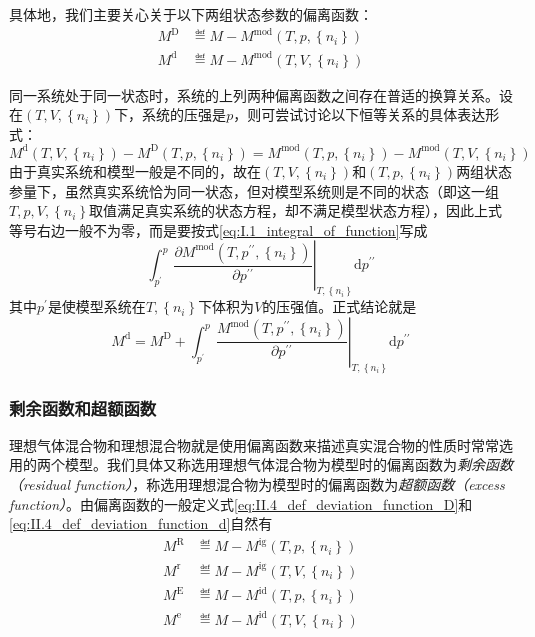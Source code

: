 \documentclass[main.tex]{subfiles}
\begin{document}
具体地，我们主要关心关于以下两组状态参数的偏离函数：
\begin{align}
  M^\text{D} & \eqdef M-M^\text{mod}\left(T,p,\left\{n_i\right\}\right)\label{eq:II.4_def_deviation_function_D} \\
  M^\text{d} & \eqdef M-M^\text{mod}\left(T,V,\left\{n_i\right\}\right)\label{eq:II.4_def_deviation_function_d}
\end{align}

同一系统处于同一状态时，系统的上列两种偏离函数之间存在普适的换算关系。设在$\left(T,V,\left\{n_i\right\}\right)$下，系统的压强是$p$，则可尝试讨论以下恒等关系的具体表达形式：
\[M^\text{d}\left(T,V,\left\{n_i\right\}\right)-M^\text{D}\left(T,p,\left\{n_i\right\}\right)=M^\text{mod}\left(T,p,\left\{n_i\right\}\right)-M^\text{mod}\left(T,V,\left\{n_i\right\}\right)\]
由于真实系统和模型一般是不同的，故在$\left(T,V,\left\{n_i\right\}\right)$和$\left(T,p,\left\{n_i\right\}\right)$两组状态参量下，虽然真实系统恰为同一状态，但对模型系统则是不同的状态（即这一组$T,p,V,\left\{n_i\right\}$取值满足真实系统的状态方程，却不满足模型状态方程），因此上式等号右边一般不为零，而是要按式\eqref{eq:I.1_integral_of_function}写成
\[\int_{p^\prime}^p\left.\frac{\partial M^\text{mod}\left(T,p^{\prime\prime},\left\{n_i\right\}\right)}{\partial p^{\prime\prime}}\right|_{T,\left\{n_i\right\}}\mathrm{d}p^{\prime\prime}\]
其中$p^\prime$是使模型系统在$T,\left\{n_i\right\}$下体积为$V$的压强值。正式结论就是
\begin{equation}\label{eq:II.4_deviation_function_relation}
  M^\text{d}=M^\text{D}+\int_{p^\prime}^p\left.\frac{M^\text{mod}\left(T,p^{\prime\prime},\left\{n_i\right\}\right)}{\partial p^{\prime\prime}}\right|_{T,\left\{n_i\right\}}\mathrm{d}p^{\prime\prime}
\end{equation}

\subsubsection{剩余函数和超额函数}
理想气体混合物和理想混合物就是使用偏离函数来描述真实混合物的性质时常常选用的两个模型。我们具体又称选用理想气体混合物为模型时的偏离函数为\emph{剩余函数（residual function）}，称选用理想混合物为模型时的偏离函数为\emph{超额函数（excess function）}。由偏离函数的一般定义式\eqref{eq:II.4_def_deviation_function_D}和\eqref{eq:II.4_def_deviation_function_d}自然有
\begin{align}
  M^\text{R} & \eqdef M-M^\text{ig}\left(T,p,\left\{n_i\right\}\right) \\
  M^\text{r} & \eqdef M-M^\text{ig}\left(T,V,\left\{n_i\right\}\right) \\
  M^\text{E} & \eqdef M-M^\text{id}\left(T,p,\left\{n_i\right\}\right) \\
  M^\text{e} & \eqdef M-M^\text{id}\left(T,V,\left\{n_i\right\}\right)
\end{align}
\end{document}
